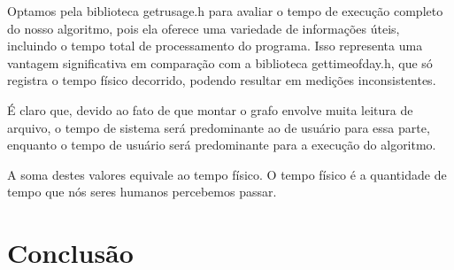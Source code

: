 \documentclass[12pt]{article}
\begin{document}
    Optamos pela biblioteca getrusage.h para avaliar o tempo de execução completo do nosso algoritmo, pois ela oferece uma variedade de informações úteis, incluindo o tempo total de processamento do programa. Isso representa uma vantagem significativa em comparação com a biblioteca gettimeofday.h, que só registra o tempo físico decorrido, podendo resultar em medições inconsistentes.

    É claro que, devido ao fato de que montar o grafo envolve muita leitura de
    arquivo, o tempo de sistema será predominante ao de usuário para essa parte,
    enquanto o tempo de usuário será predominante para a execução do algoritmo.

    A soma destes valores equivale ao tempo físico. O tempo físico é a
    quantidade de tempo que nós seres humanos percebemos passar. 


    \section{Conclusão}

    \printbibliography[title={Whole bibliography}]
\end{document}
